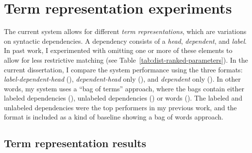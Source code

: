 \section{Term representation experiments}
\label{sec:exp-term-reps}
The current system allows for different \textit{term representations}, which are variations on syntactic dependencies. A dependency consists of a \textit{head}, \textit{dependent}, and \textit{label}. In past work, I experimented with omitting one or more of these elements to allow for less restrictive matching (see Table~\ref{tab:dist-ranked-parameters}). In the current dissertation, I compare the system performance using the three formats: \textit{label-dependent-head} (), \textit{dependent-head} only (), and \textit{dependent} only (). In other words, my system uses a ``bag of terms'' approach, where the bags contain either labeled dependencies (), unlabeled dependencies () or words (). The labeled and unlabeled dependencies were the top performers in my previous work, and the  format is included as a kind of baseline showing a bag of words approach.

\subsection{Term representation results}
\label{sec:term-norm-results}

